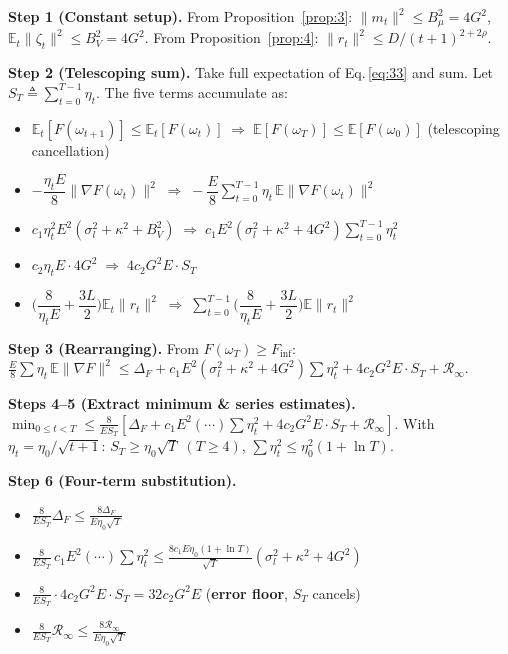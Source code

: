 \documentclass[journal]{IEEEtran}
\begin{document}
\noindent\textbf{Step 1 (Constant setup).}
From Proposition~\ref{prop:3}: \(\|m_t\|^2 \le B_\mu^2 = 4G^2\),
\(\mathbb E_t\|\zeta_t\|^2 \le B_V^2 = 4G^2\).
From Proposition~\ref{prop:4}: \(\|r_t\|^2 \le D/(t+1)^{2+2\rho}\).

\noindent\textbf{Step 2 (Telescoping sum).}
Take full expectation of Eq.\,\eqref{eq:33} and sum.
Let \(S_T \triangleq \sum_{t=0}^{T-1}\eta_t\).
The five terms accumulate as:
\begin{itemize}[leftmargin=*,nosep]
  \item \(\mathbb E_t[F(\omega_{t+1})] \le \mathbb E_t[F(\omega_t)]
        \;\Longrightarrow\; \mathbb E[F(\omega_T)] \le \mathbb E[F(\omega_0)]\)
        (telescoping cancellation)
  \item \(-\dfrac{\eta_t E}{8}\|\nabla F(\omega_t)\|^2
        \;\Longrightarrow\; -\dfrac{E}{8}\sum_{t=0}^{T-1}\eta_t\,\mathbb E\|\nabla F(\omega_t)\|^2\)
  \item \(c_1\eta_t^2 E^2(\sigma_l^2 + \kappa^2 + B_V^2)
        \;\Longrightarrow\; c_1 E^2(\sigma_l^2 + \kappa^2 + 4G^2)\sum_{t=0}^{T-1}\eta_t^2\)
  \item \(c_2\eta_t E \cdot 4G^2
        \;\Longrightarrow\; 4c_2 G^2 E \cdot S_T\)
  \item \(\bigl(\dfrac{8}{\eta_t E} + \dfrac{3L}{2}\bigr)\mathbb E_t\|r_t\|^2
        \;\Longrightarrow\; \sum_{t=0}^{T-1}\bigl(\dfrac{8}{\eta_t E} + \dfrac{3L}{2}\bigr)\mathbb E\|r_t\|^2\)
\end{itemize}

\noindent\textbf{Step 3 (Rearranging).}
From \(F(\omega_T) \ge F_{\inf}\):
\(\frac{E}{8}\sum\eta_t\,\mathbb E\|\nabla F\|^2
 \le \Delta_F + c_1 E^2(\sigma_l^2 + \kappa^2 + 4G^2)\sum\eta_t^2
    + 4c_2 G^2 E \cdot S_T + \mathcal R_\infty\).

\noindent\textbf{Steps 4--5 (Extract minimum \& series estimates).}
\(\min_{0\le t<T} \le \frac{8}{E S_T}[\Delta_F + c_1 E^2(\cdots)\sum\eta_t^2 + 4c_2 G^2 E \cdot S_T + \mathcal R_\infty]\).
With \(\eta_t = \eta_0/\sqrt{t+1}\):
\(S_T \ge \eta_0\sqrt{T}\;(T\ge 4)\), \(\sum\eta_t^2 \le \eta_0^2(1 + \ln T)\).

\noindent\textbf{Step 6 (Four-term substitution).}
\begin{itemize}\setlength\itemsep{0pt}
  \item[] \(\displaystyle\frac{8}{E S_T}\Delta_F \le \frac{8\Delta_F}{E\eta_0\sqrt{T}}\)
  \item[] \(\displaystyle\frac{8}{E S_T}\,c_1 E^2(\cdots)\sum\eta_t^2
           \le \frac{8c_1 E\eta_0(1+\ln T)}{\sqrt{T}}(\sigma_l^2 + \kappa^2 + 4G^2)\)
  \item[] \(\displaystyle\frac{8}{E S_T}\cdot 4c_2 G^2 E \cdot S_T = 32 c_2 G^2 E\)
           (\textbf{error floor}, \(S_T\) cancels)
  \item[] \(\displaystyle\frac{8}{E S_T}\mathcal R_\infty \le \frac{8\mathcal R_\infty}{E\eta_0\sqrt{T}}\)
\end{itemize}
\end{document}
